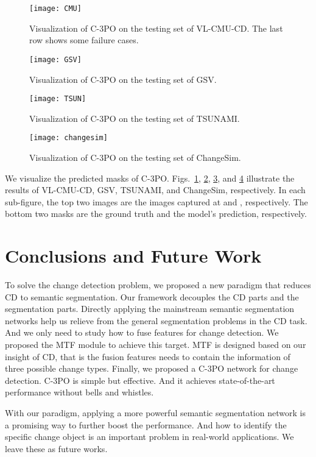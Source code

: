 \documentclass[review]{elsarticle}
\begin{document}
\begin{figure}
	\centering
	\texttt{[image: CMU]}
	\caption{Visualization of C-3PO on the testing set of VL-CMU-CD. The last row shows some failure cases.}
	\label{fig:CMU}
\end{figure}

\begin{figure}
	\centering
	\texttt{[image: GSV]}
	\caption{Visualization of C-3PO on the testing set of GSV.}
	\label{fig:GSV}
\end{figure}

\begin{figure}
	\centering
	\texttt{[image: TSUN]}
	\caption{Visualization of C-3PO on the testing set of TSUNAMI.}
	\label{fig:TSUN}
\end{figure}

\begin{figure}
	\centering
	\texttt{[image: changesim]}
	\caption{Visualization of C-3PO on the testing set of ChangeSim.}
	\label{fig:changesim}
\end{figure}

We visualize the predicted masks of C-3PO. Figs.~\ref{fig:CMU}, \ref{fig:GSV}, \ref{fig:TSUN}, and \ref{fig:changesim} illustrate the results of VL-CMU-CD, GSV, TSUNAMI, and ChangeSim, respectively. In each sub-figure, the top two images are the images captured at  and , respectively. The bottom two masks are the ground truth and the model's prediction, respectively.

\section{Conclusions and Future Work}

To solve the change detection problem, we proposed a new paradigm that reduces CD to semantic segmentation. Our framework decouples the CD parts and the segmentation parts. Directly applying the mainstream semantic segmentation networks help us relieve from the general segmentation problems in the CD task. And we only need to study how to fuse features for change detection. We proposed the MTF module to achieve this target. MTF is designed based on our insight of CD, that is the fusion features needs to contain the information of three possible change types. Finally, we proposed a C-3PO network for change detection. C-3PO is simple but effective. And it achieves state-of-the-art performance without bells and whistles.

With our paradigm, applying a more powerful semantic segmentation network is a promising way to further boost the performance. And how to identify the specific change object is an important problem in real-world applications. We leave these as future works.


\end{document}
